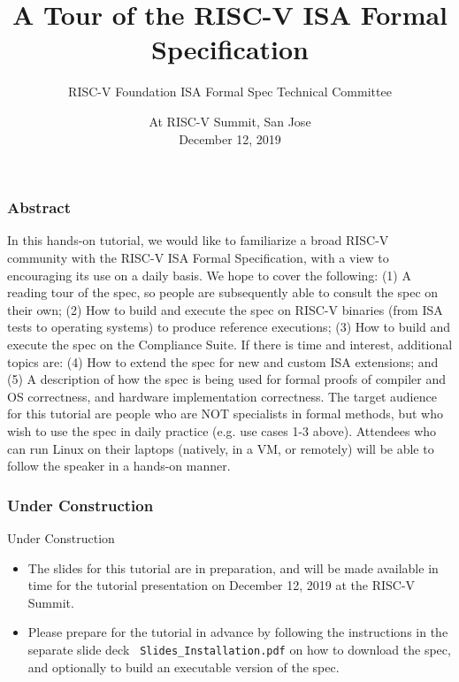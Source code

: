 \documentclass[aspectratio=169]{beamer}
\title{A Tour of the RISC-V ISA Formal Specification}
\author{RISC-V Foundation ISA Formal Spec Technical Committee}
\date{At RISC-V Summit, San Jose \\ December 12, 2019}
\begin{document}

\begin{frame}
  \titlepage
\end{frame}

\begin{frame}
  \frametitle{Abstract}

  \scriptsize

  In this hands-on tutorial, we would like to familiarize a broad
  RISC-V community with the RISC-V ISA Formal Specification, with a
  view to encouraging its use on a daily basis.  We hope to cover the
  following: (1) A reading tour of the spec, so people are
  subsequently able to consult the spec on their own; (2) How to build
  and execute the spec on RISC-V binaries (from ISA tests to operating
  systems) to produce reference executions; (3) How to build and
  execute the spec on the Compliance Suite.  If there is time and
  interest, additional topics are: (4) How to extend the spec for new
  and custom ISA extensions; and (5) A description of how the spec is
  being used for formal proofs of compiler and OS correctness, and
  hardware implementation correctness.  The target audience for this
  tutorial are people who are NOT specialists in formal methods, but
  who wish to use the spec in daily practice (e.g. use cases 1-3
  above).  Attendees who can run Linux on their laptops (natively, in
  a VM, or remotely) will be able to follow the speaker in a hands-on
  manner.

\end{frame}





\begin{frame}
  \frametitle{Under Construction}

  \begin{block}{Under Construction}

    \begin{itemize}

    \item The slides for this tutorial are in preparation, and will be
      made available in time for the tutorial presentation on December
      12, 2019 at the RISC-V Summit.

    \item Please prepare for the tutorial in advance by following the
      instructions in the separate slide deck {\tt
        Slides\_Installation.pdf} on how to download the spec, and
      optionally to build an executable version of the spec.

    \end{itemize}
  \end{block}

\end{frame}
\end{document}
